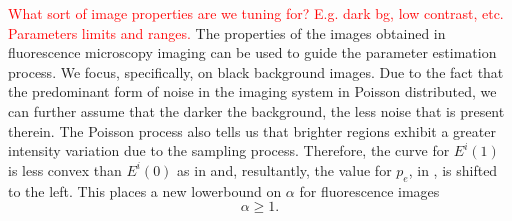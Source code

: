 \textcolor{red}{What sort of image properties are we tuning for? E.g. dark bg, low contrast, etc. Parameters limits and ranges.} The properties of the images obtained in fluorescence microscopy imaging can be used to guide the parameter estimation process. We focus, specifically, on black background images. Due to the fact that the predominant form of noise in the imaging system in Poisson distributed, we can further assume that the darker the background, the less noise that is present therein. The Poisson process also tells us that brighter regions exhibit a greater intensity variation due to the sampling process. Therefore, the curve for $E^i(1)$ is less convex than $E^i(0)$ as in  and, resultantly, the value for $p_e$, in , is shifted to the left. This places a new lowerbound on $\alpha$ for fluorescence images
\begin{equation}
	\alpha \geq 1.
	\label{eq:alphalowerboundFM}
\end{equation}

